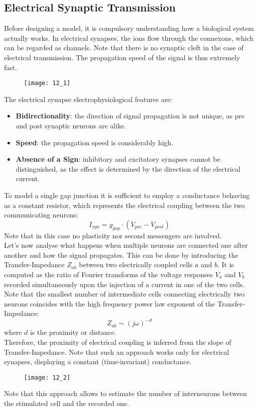 \subsection{Electrical Synaptic Transmission}
Before designing a model, it is compulsory understanding how a biological system
actually works. In electrical synapses, the ions flow through the connexons,
which can be regarded as channels. Note that there is no synaptic cleft in
the case of electrical transmission. The propagation speed of the signal is
thus extremely fast.
\begin{figure}[H]
    \texttt{[image: 12\_1]}
    \centering
\end{figure}
The electrical synapse electrophysiological features are:
\begin{itemize}
    \item \textbf{Bidirectionality}: the direction of signal propagation is
          not unique, as pre and post synaptic neurons are alike.
    \item \textbf{Speed}: the propagation speed is considerably high.
    \item \textbf{Absence of a Sign}: inhibitory and excitatory synapses
          cannot be distinguished, as the effect is determined by the direction of
          the electrical current.
\end{itemize}
To model a single gap junction it is sufficient to employ a conductance behaving as
a constant resistor, which represents the electrical coupling between the
two communicating neurons:
\begin{equation*}
    I_{syn}=g_{gap}\cdot{(V_{pre}-V_{post})}
\end{equation*}
Note that in this case no plasticity nor second messengers are involved.\\
Let's now analyse what happens when multiple neurons are connected one after another
and how the signal propagates. This can be done by introducing the Transfer-Impedance
\(Z_{ab}\) between two electrically coupled cells \(a\) and \(b\). It is computed as
the ratio of Fourier transforms of the voltage responses \(V_{a}\) and \(V_{b}\)
recorded simultaneously upon the injection of a current in one of the two cells.
Note that the smallest number of intermediate cells connecting electrically two neurons
coincides with the high frequency power law exponent of the Transfer-Impedance:
\begin{equation*}
    Z_{ab}\sim{(j\omega)^{-d}}
\end{equation*}
where \(d\) is the proximity or distance.\\
Therefore, the proximity of electrical coupling is inferred from the slope of Transfer-Impedance.
Note that such an approach works only for electrical synapses, displaying a constant (time-invariant)
conductance.
\begin{figure}[H]
    \texttt{[image: 12\_2]}
    \centering
\end{figure}
Note that this approach allows to estimate the number of interneurons between the stimulated
cell and the recorded one.

